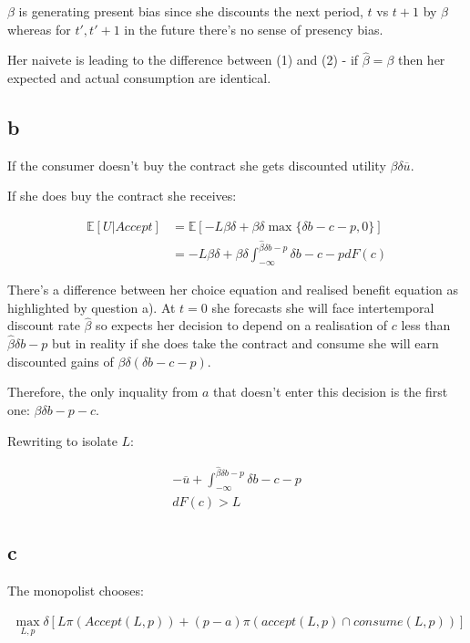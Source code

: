 \documentclass{article}
\begin{document}
$\beta$ is generating present bias since she discounts the next period, $t$ vs 
$t+1$ by $\beta$ whereas for $t', t'+1$ in the future there's no sense of 
presency bias.


Her naivete is leading to the difference between (1) and (2) - if $\hat{\beta} = \beta$
then her expected and actual consumption are identical.


\subsection*{b}


If the consumer doesn't buy the contract she gets discounted utility $\beta \delta \overline{u}$.

If she does buy the contract she receives:

\begin{align*}
    \mathbb{E}[U | \textit{Accept}] &= \mathbb{E}\left[ 
        -L\beta \delta + \beta \delta \max\{\delta b - c - p, 0\} 
    \right] \\
    &= -L \beta \delta + \beta \delta \int^{\hat{\beta}\delta b - p}_{-\infty} \delta b - c - p dF(c)
\end{align*}


There's a difference between her choice equation and realised benefit equation as 
highlighted by question a). At $t=0$ she forecasts she will face intertemporal 
discount rate $\hat{\beta}$ so expects her decision to depend on a realisation of 
$c$ less than $\hat{\beta}\delta b - p$ but in reality if she does take the 
contract and consume she will earn discounted gains of $\beta \delta (\delta b - c - p)$. 



Therefore, the only inquality from $a$ that doesn't enter this decision is the 
first one: $\beta \delta b - p - c$.


Rewriting to isolate $L$:

\begin{align*}
    - \overline{u} + \int^{\hat{\beta}\delta b - p}_{-\infty} \delta b - c - p \\ dF(c) > L
\end{align*}

\subsection*{c}


The monopolist chooses:

\begin{align*}
    \max_{L,p} \delta \left[ L \pi(\textit{Accept}(L, p)) + (p - a) \pi(\textit{accept}(L, p) \cap \textit{consume}(L, p)) \right]
\end{align*}
\end{document}
